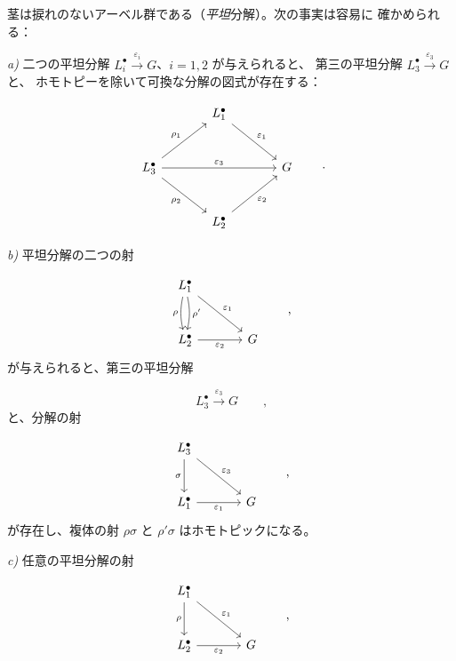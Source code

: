 \clearpage
{}
茎は捩れのないアーベル群である（\emph{平坦}分解）。次の事実は容易に
確かめられる：

\noindent\emph{a)} 二つの平坦分解
$L_i^{\bullet}\xrightarrow{\varepsilon_i}G$、$i=1,2$ が与えられると、
第三の平坦分解 $L_3^{\bullet}\xrightarrow{\varepsilon_3}G$ と、
ホモトピーを除いて可換な分解の図式が存在する：

\[
\begin{tikzcd}[column sep=large,row sep=large]
  & L_1^{\bullet} \arrow[dr,"\varepsilon_1"] & \\
L_3^{\bullet} \arrow[ur,"\rho_1"] \arrow[rr,"\varepsilon_3"]
  \arrow[dr,"\rho_2"'] && G \\
  & L_2^{\bullet} \arrow[ur,"\varepsilon_2"'] &
\end{tikzcd}
\qquad\text{.}
\]

\noindent\emph{b)} 平坦分解の二つの射

\[
\begin{tikzcd}[column sep=large,row sep=large]
L_1^{\bullet}
  \arrow[d,bend right=12,"\rho"']
  \arrow[d,bend left=12,"\rho'"]
  \arrow[dr,"\varepsilon_1"] & \\
L_2^{\bullet} \arrow[r,"\varepsilon_2"'] & G
\end{tikzcd}
\qquad\text{,}
\]
が与えられると、第三の平坦分解

\[
L_3^{\bullet}\xrightarrow{\varepsilon_3}G
\qquad\text{,}
\]
と、分解の射

\[
\begin{tikzcd}[column sep=large,row sep=large]
L_3^{\bullet} \arrow[d,"\sigma"'] \arrow[dr,"\varepsilon_3"] & \\
L_1^{\bullet} \arrow[r,"\varepsilon_1"'] & G
\end{tikzcd}
\qquad\text{,}
\]
が存在し、複体の射 $\rho\sigma$ と $\rho'\sigma$ はホモトピックになる。

\noindent\emph{c)} 任意の平坦分解の射

\[
\begin{tikzcd}[column sep=large,row sep=large]
L_1^{\bullet} \arrow[d,"\rho"'] \arrow[dr,"\varepsilon_1"] & \\
L_2^{\bullet} \arrow[r,"\varepsilon_2"'] & G
\end{tikzcd}
\qquad\text{,}
\]
